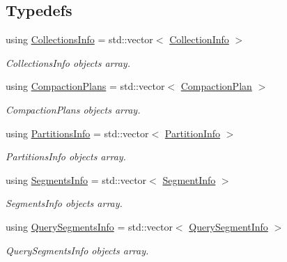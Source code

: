 \subsection*{Typedefs}
\begin{DoxyCompactItemize}
\item 
\mbox{\label{namespacemilvus_aca75f624e858185d26527e9c47b40ed6}} 
using \hyperlink{namespacemilvus_aca75f624e858185d26527e9c47b40ed6}{Collections\+Info} = std\+::vector$<$ \hyperlink{classmilvus_1_1_collection_info}{Collection\+Info} $>$
\begin{DoxyCompactList}\small\item\em Collections\+Info objects array. \end{DoxyCompactList}\item 
\mbox{\label{namespacemilvus_ae8e1cc7774a3ff7a1c5d564c1937bec8}} 
using \hyperlink{namespacemilvus_ae8e1cc7774a3ff7a1c5d564c1937bec8}{Compaction\+Plans} = std\+::vector$<$ \hyperlink{classmilvus_1_1_compaction_plan}{Compaction\+Plan} $>$
\begin{DoxyCompactList}\small\item\em Compaction\+Plans objects array. \end{DoxyCompactList}\item 
\mbox{\label{namespacemilvus_affb31ba1d459f7fa231ffda305c08733}} 
using \hyperlink{namespacemilvus_affb31ba1d459f7fa231ffda305c08733}{Partitions\+Info} = std\+::vector$<$ \hyperlink{classmilvus_1_1_partition_info}{Partition\+Info} $>$
\begin{DoxyCompactList}\small\item\em Partitions\+Info objects array. \end{DoxyCompactList}\item 
\mbox{\label{namespacemilvus_ac4d75d0f392eb243587a67248164636b}} 
using \hyperlink{namespacemilvus_ac4d75d0f392eb243587a67248164636b}{Segments\+Info} = std\+::vector$<$ \hyperlink{classmilvus_1_1_segment_info}{Segment\+Info} $>$
\begin{DoxyCompactList}\small\item\em Segments\+Info objects array. \end{DoxyCompactList}\item 
\mbox{\label{namespacemilvus_a12c0975ef69afebb6673596a78f0c1c6}} 
using \hyperlink{namespacemilvus_a12c0975ef69afebb6673596a78f0c1c6}{Query\+Segments\+Info} = std\+::vector$<$ \hyperlink{classmilvus_1_1_query_segment_info}{Query\+Segment\+Info} $>$
\begin{DoxyCompactList}\small\item\em Query\+Segments\+Info objects array. \end{DoxyCompactList}\end{DoxyCompactItemize}
